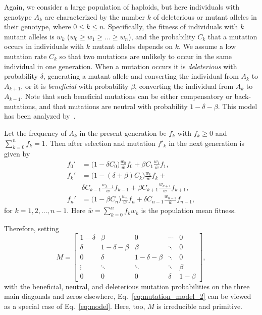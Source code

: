 \documentclass[9pt, a4paper, twocolumn]{extarticle}
\begin{document}
Again, we consider a large population of haploids, but here individuals with genotype $A_k$ are characterized by the number $k$ of deleterious or mutant alleles in their genotype, where $0 \le k \le n$.
Specifically, the fitness of individuals with $k$ mutant alleles is $w_k$ ($w_0 \ge w_1 \ge \ldots \ge w_n$),
and the probability $C_k$ that a mutation occurs in individuals with $k$ mutant alleles depends on $k$.
We assume a low mutation rate $C_k$ so that two mutations are unlikely to occur in the same individual in one generation.
When a mutation occurs it is \emph{deleterious} with probability $\delta$, generating a mutant allele and converting the individual from $A_k$ to $A_{k+1}$,
or it is \emph{beneficial} with probability $\beta$, converting the individual from $A_k$ to $A_{k-1}$.
Note that such beneficial mutations can be either compensatory or back-mutations, and that mutations are neutral with probability $1-\delta-\beta$.
This model has been analyzed by~\citet{Ram2012}.

Let the frequency of $A_k$ in the present generation be $f_k$ with $f_k \ge 0$ and $\sum_{k=0}^{n}{f_k}=1$.
Then after selection and mutation $f'_k$ in the next generation is given by
\begin{equation}
\begin{aligned}
f_0' &= \big(1 - \delta C_0\big) \frac{w_0}{\bar{w}} f_0 + \beta C_{1} \frac{w_{1}}{\bar{w}} f_{1}, \\
f_k' &= \big(1 - (\delta+\beta) C_k\big) \frac{w_k}{\bar{w}} f_k + \\
	 & \delta C_{k-1} \frac{w_{k-1}}{\bar{w}} f_{k-1} + 
	 \beta C_{k+1} \frac{w_{k+1}}{\bar{w}} f_{k+1}, \\
f_n' &= \big(1 - \beta C_n\big) \frac{w_n}{\bar{w}} f_n + \delta C_{n-1} \frac{w_{n-1}}{\bar{w}} f_{n-1},	 
\end{aligned}
\label{eq:mutation_model_2}
\end{equation}
for $k=1,2,\ldots, n-1$.
Here $\bar{w}=\sum_{k=0}^{n}{f_k w_k}$ is the population mean fitness.

Therefore, setting 
\begin{equation}
{M} = \begin{bmatrix}
1-\delta & \beta & 0 &  \cdots & 0\\
\delta & 1-\delta-\beta & \beta &  \ddots & 0\\
0 & \delta & 1-\delta-\beta & \ddots & 0 \\
\vdots & \ddots & \ddots & \ddots & \beta \\
0 & 0 & 0 & \delta & 1-\beta
\end{bmatrix},
\end{equation}
with the beneficial, neutral, and deleterious mutation probabilities on the three main diagonals and zeros elsewhere, 
Eq.~\ref{eq:mutation_model_2} can be viewed as a special case of Eq.~\ref{eq:model}.
Here, too, ${M}$ is irreducible and primitive.
\end{document}
